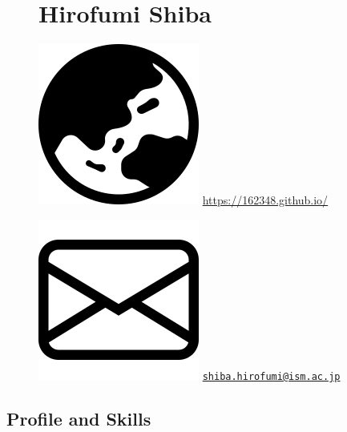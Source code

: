 \documentclass[
]{article}
\date{}
\begin{document}
\begin{figure}

\begin{minipage}{0.50\linewidth}

\section{\texorpdfstring{\Huge Hirofumi
Shiba}{Hirofumi Shiba}}\label{hirofumi-shiba}

\end{minipage}%
%
\begin{minipage}{0.50\linewidth}

\hfill \includegraphics{globe-asia-australia.png}
\url{https://162348.github.io/}

\par

\hfill \includegraphics{envelope.png}
\href{mailto:shiba.hirofumi@ism.ac.jp}{\nolinkurl{shiba.hirofumi@ism.ac.jp}}\end{minipage}%

\end{figure}%

\vspace{-1em}

\subsection{Profile and Skills}\label{profile-and-skills}
\end{document}
